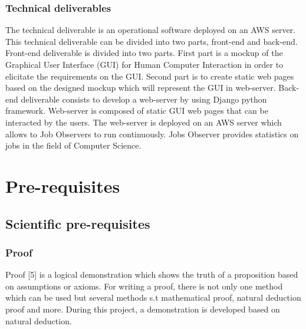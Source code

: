 \documentclass[conference,compsoc]{IEEEtran}
\begin{document}
\subsubsection{Technical deliverables}
The technical deliverable is an operational software deployed on an AWS server. This technical deliverable can be divided into two parts, front-end and back-end. 
\newline
Front-end deliverable is divided into two parts. First part is a mockup of the Graphical User Interface (GUI) for Human Computer Interaction in order to elicitate the requirements on the GUI. Second part is to create static web pages based on the designed mockup which will represent the GUI in web-server. 
\newline
Back-end deliverable consists to develop a web-server by using Django python framework. Web-server is composed of static GUI web pages that can be interacted by the users. The web-server is deployed on an AWS server which allows to Job Observers to run continuously. Jobs Observer provides statistics on jobs in the field of Computer Science.  


\section{Pre-requisites} 

\subsection{Scientific pre-requisites}
\subsubsection{Proof}
Proof [5] is a logical demonstration which shows the truth of a proposition based on assumptions or axioms. For writing a proof, there is not only one method which can be used but several methods s.t mathematical proof, natural deduction proof and more. During this project, a demonstration is developed based on natural deduction. 
\end{document}
